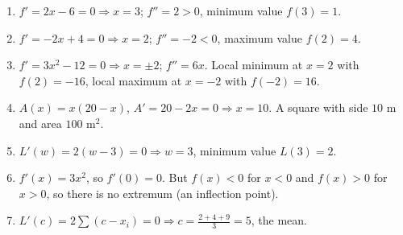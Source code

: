 \begin{enumerate}[label=\textbf{\ansnum.\arabic*}]
  \item $f'=2x-6=0\Rightarrow x=3$; $f''=2>0$, minimum value $f(3)=1$.
  \item $f'=-2x+4=0\Rightarrow x=2$; $f''=-2<0$, maximum value $f(2)=4$.
  \item $f'=3x^2-12=0\Rightarrow x=\pm2$; $f''=6x$. Local minimum at $x=2$ with $f(2)=-16$, local maximum at $x=-2$ with $f(-2)=16$.
  \item $A(x)=x(20-x)$, $A'=20-2x=0\Rightarrow x=10$. A square with side $10$ m and area $100$ m$^2$.
  \item $L'(w)=2(w-3)=0\Rightarrow w=3$, minimum value $L(3)=2$.
  \item $f'(x)=3x^2$, so $f'(0)=0$. But $f(x)<0$ for $x<0$ and $f(x)>0$ for $x>0$, so there is no extremum (an inflection point).
  \item[\textbf{6.7}] $L'(c)=2\sum(c-x_i)=0\Rightarrow c=\frac{2+4+9}{3}=5$, the mean.
\end{enumerate}
